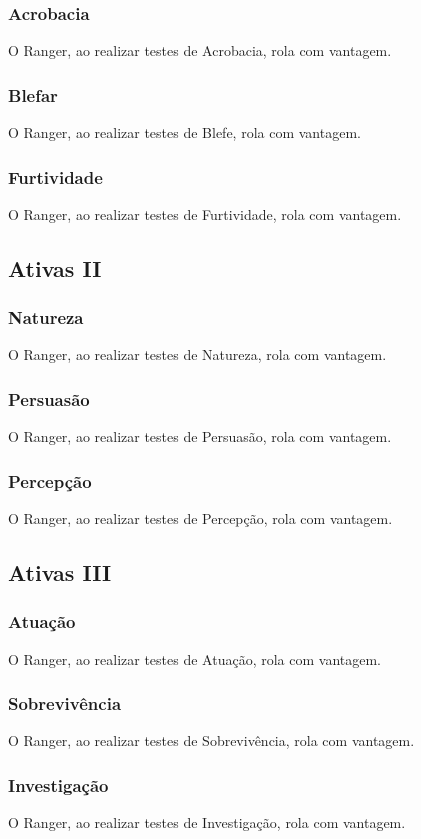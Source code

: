 \documentclass[10pt,twoside,twocolumn]{book}
\begin{document}
\subsubsection*{Acrobacia}
O Ranger, ao realizar testes de Acrobacia, rola com vantagem.
\subsubsection*{Blefar}
O Ranger, ao realizar testes de Blefe, rola com vantagem.
\subsubsection*{Furtividade}
O Ranger, ao realizar testes de Furtividade, rola com vantagem.

\subsection*{Ativas II}
\subsubsection*{Natureza}
O Ranger, ao realizar testes de Natureza, rola com vantagem.
\subsubsection*{Persuasão}
O Ranger, ao realizar testes de Persuasão, rola com vantagem.
\subsubsection*{Percepção}
O Ranger, ao realizar testes de Percepção, rola com vantagem.

\subsection*{Ativas III}
\subsubsection*{Atuação}
O Ranger, ao realizar testes de Atuação, rola com vantagem.
\subsubsection*{Sobrevivência}
O Ranger, ao realizar testes de Sobrevivência, rola com vantagem.
\subsubsection*{Investigação}
O Ranger, ao realizar testes de Investigação, rola com vantagem.
\end{document}

